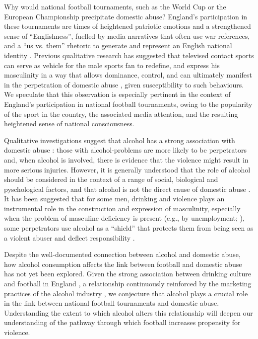 \documentclass[12pt, a4paper]{article}
\begin{document}
Why would national football tournaments, such as the World Cup or the European Championship precipitate domestic abuse? England's participation in these tournaments are times of heightened patriotic emotions and a strengthened sense of ``Englishness'', fuelled by media narratives that often use war references, and a ``us vs. them'' rhetoric to generate and represent an English national identity \citep{Vincent2014}. Previous qualitative research has suggested that televised contact sports can serve as vehicle for the male sports fan to redefine, and express his masculinity in a way that allows dominance, control, and can ultimately manifest in the perpetration of domestic abuse \citep{Sabo,Swallow}, given susceptibility to such behaviours. We speculate that this observation is especially pertinent in the context of England's participation in national football tournaments, owing to the popularity of the sport in the country, the associated media attention, and the resulting heightened sense of national consciousness.
%


Qualitative investigations suggest that alcohol has a strong association with domestic abuse \citep{Peralta2010}: those with alcohol-problems are more likely to be perpetrators and, when alcohol is involved, there is evidence that the violence might result in more serious injuries. However, it is generally understood that the role of alcohol should be considered in the context of a range of social, biological and pyschological factors, and that alcohol is not the direct cause of domestic abuse \citep{Javaid2015,Peralta2010}. It has been suggested that for some men, drinking and violence plays an instrumental role in the construction and expression of masculinity, especially when the problem of masculine deficiency is present (e.g., by unemployment; \citealt{Peralta2010}), some perpetrators use alcohol as a ``shield'' that protects them from being seen as a violent abuser and deflect responsibility \citep{Javaid2015}. 
%
%
%


Despite the well-documented connection between alcohol and domestic abuse, how alcohol consumption affects the link between football and domestic abuse has not yet been explored. Given the strong association between drinking culture and football in England \citep{Dixon2014}, a relationship continuously reinforced by the marketing practices of the alcohol industry \citep{Gornall2014}, we conjecture that alcohol plays a crucial role in the link between national football tournaments and domestic abuse. Understanding the extent to which alcohol alters this relationship will deepen our understanding of the pathway through which football increases propensity for violence.
%
\end{document}
